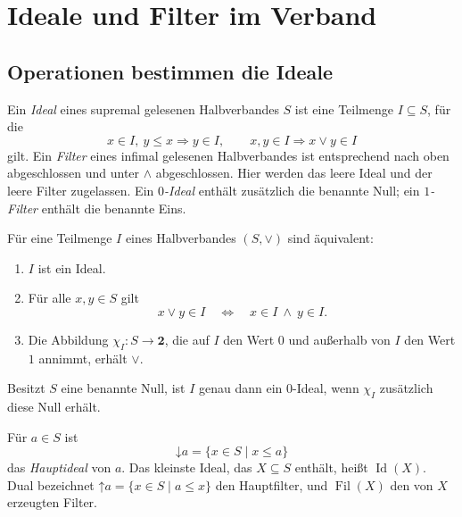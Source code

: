 \chapter{Ideale und Filter im Verband}
\label{b45guide:ch:ideals}

\section{Operationen bestimmen die Ideale}

\begin{definition}
\label{b45guide:def:ideal}
Ein \emph{Ideal} eines supremal gelesenen Halbverbandes $S$
ist eine Teilmenge $I\subseteq S$, für die
\[
 x\in I,\ y\leq x\Rightarrow y\in I,
 \qquad x,y\in I\Rightarrow x\vee y\in I
\]
gilt. Ein \emph{Filter} eines infimal gelesenen Halbverbandes
ist entsprechend nach oben abgeschlossen und unter $\wedge$
abgeschlossen.
Hier werden das leere Ideal und der leere Filter zugelassen.
Ein \emph{$0$-Ideal} enthält zusätzlich die benannte Null;
ein \emph{$1$-Filter} enthält die benannte Eins.
\end{definition}

\begin{theorem}
\label{b45guide:thm:ideal-test}
Für eine Teilmenge $I$ eines Halbverbandes $(S,\vee)$ sind äquivalent:
\begin{enumerate}
\item $I$ ist ein Ideal.
\item Für alle $x,y\in S$ gilt
\[
 x\vee y\in I\quad\Longleftrightarrow\quad x\in I\ \land\ y\in I.
\]
\item Die Abbildung $\chi_I:S\to\mathbf2$, die auf $I$ den Wert $0$
und außerhalb von $I$ den Wert $1$ annimmt, erhält $\vee$.
\end{enumerate}
Besitzt $S$ eine benannte Null, ist $I$ genau dann ein $0$-Ideal,
wenn $\chi_I$ zusätzlich diese Null erhält. \cite{smith}
\end{theorem}

\begin{definition}
\label{b45guide:def:principal}
Für $a\in S$ ist
\[
 \mathord\downarrow a=\{x\in S\mid x\leq a\}
\]
das \emph{Hauptideal} von $a$.
Das kleinste Ideal, das $X\subseteq S$ enthält, heißt
$\operatorname{Id}(X)$. Dual bezeichnet
$\mathord\uparrow a=\{x\in S\mid a\leq x\}$ den Hauptfilter,
und $\operatorname{Fil}(X)$ den von $X$ erzeugten Filter.
\end{definition}

